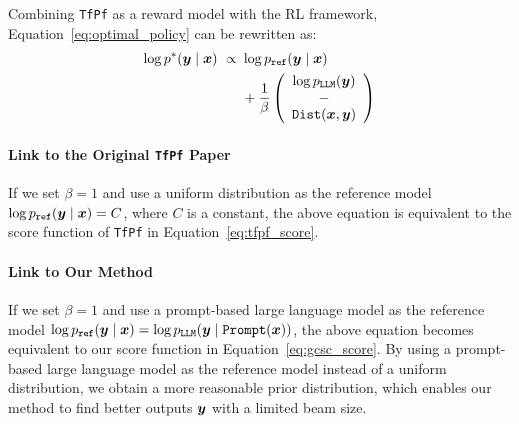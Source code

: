 Combining \texttt{TfPf} as a reward model with the RL framework, Equation~\ref{eq:optimal_policy} can be rewritten as:
\begin{equation}
    \begin{aligned}
        \log p^*({\boldsymbol{y}}\mid {\boldsymbol{x}})\ \propto\  & \log p_{\mathtt{ref}}({\boldsymbol{y}}\mid {\boldsymbol{x}})                                 \\
                                                             & + \frac{1}{\beta} \left(\begin{array}{c}\log p_{\mathtt{LLM}}({\boldsymbol{y}}) \\
                                                                                               -                                       \\
                                                                                               \mathtt{Dist}({\boldsymbol{x}}, {\boldsymbol{y}})\end{array}\right)
    \end{aligned}
\end{equation}

\paragraph{Link to the Original \texttt{TfPf} Paper}
If we set $\beta = 1$ and use a uniform distribution as the reference model $\log p_{\mathtt{ref}}({\boldsymbol{y}}\mid {\boldsymbol{x}}) = C$, where $C$ is a constant, the above equation is equivalent to the score function of \texttt{TfPf} in Equation~\ref{eq:tfpf_score}.

\paragraph{Link to Our Method}
If we set $\beta = 1$ and use a prompt-based large language model as the reference model $\log p_{\mathtt{ref}}({\boldsymbol{y}}\mid {\boldsymbol{x}}) = \log p_{\mathtt{LLM}}({\boldsymbol{y}}\mid \mathtt{Prompt}({\boldsymbol{x}}))$, the above equation becomes equivalent to our score function in Equation~\ref{eq:gcsc_score}.
By using a prompt-based large language model as the reference model instead of a uniform distribution, we obtain a more reasonable prior distribution, which enables our method to find better outputs ${\boldsymbol{y}}$ with a limited beam size.


